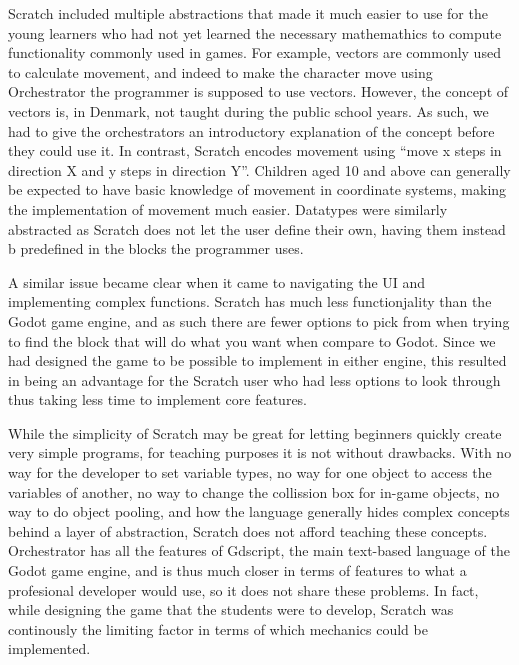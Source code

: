 Scratch included multiple abstractions that made it
much easier to use for the young learners who had not yet learned the
necessary mathemathics to compute functionality commonly used in
games.
For example, vectors are commonly used to calculate movement,
and indeed to make the character move using Orchestrator the
programmer is supposed to use vectors.
However, the concept of
vectors is, in Denmark, not taught during the public school years.
As
such, we had to give the orchestrators an introductory
explanation of the concept before they could use it.
In contrast,
Scratch encodes movement using “move x steps in direction X and y
steps in direction Y”. Children aged 10 and above can generally be
expected to have basic knowledge of movement in coordinate systems,
making the implementation of movement much easier.
Datatypes were
similarly abstracted as Scratch does not let the user define their
own, having them instead b predefined in the blocks the programmer
uses.

A similar issue became clear when it came to navigating the UI and
implementing complex functions.
Scratch has much less functionjality
than the Godot game engine, and as such there are fewer options to
pick from when trying to find the block that will do what you want
when compare to Godot.
Since we had designed the game to be possible
to implement in either engine, this resulted in being an advantage
for the Scratch user who had less options to look through thus taking
less time to implement core features.

While the simplicity of Scratch may be great for letting beginners
quickly create very simple programs, for teaching purposes it is not
without drawbacks.
With no way for the developer to set variable
types, no way for one object to access the variables of another, no
way to change the collission box for in-game objects, no way to do
object pooling, and how the language generally hides complex concepts
behind a layer of abstraction, Scratch does not afford teaching these
concepts.
Orchestrator has all the features of Gdscript, the main
text-based language of the Godot game engine, and is thus much closer
in terms of features to what a profesional developer would use, so it
does not share these problems.
In fact, while designing the game that
the students were to develop, Scratch was continously the limiting
factor in terms of which mechanics could be implemented.




